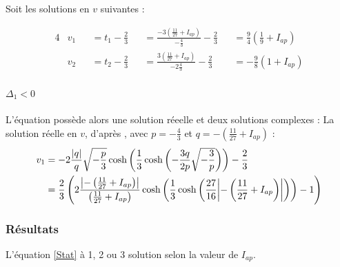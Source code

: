 \documentclass[12pt,a4paper,onecolumn]{article}
\begin{document}
Soit les solutions en $v$ suivantes :

\begin{alignat}{4}
&v_1 &&= t_1 - \frac{2}{3} &&= \displaystyle{\frac{-3(\frac{11}{27} + I_{ap})}{-\frac{4}{3}} - \frac{2}{3}} &&= \frac{9}{4}\left(\frac{1}{9} + I_{ap}\right) \\
&v_2 &&= t_2 - \frac{2}{3} &&= \displaystyle{\frac{3(\frac{11}{27} + I_{ap})}{-2\frac{4}{3}} - \frac{2}{3}} &&= -\frac{9}{8}\left(1 + I_{ap}\right)
\end{alignat}

\paragraph{$\Delta_1 < 0$} L'équation possède alors une solution réeelle et deux solutions complexes :
La solution réelle en $v$, d'après \cite{holmes200286}, avec $p = -\displaystyle{\frac{4}{3}}$ et $q = -\displaystyle{\left(\frac{11}{27} + I_{ap}\right)}$ :
\begin{align}
v_1 &= \displaystyle{-2\frac{\abs{q}}{q}\sqrt{-\frac{p}{3}}\cosh\left(\frac{1}{3}\cosh\left(-\frac{3q}{2p}\sqrt{-\frac{3}{p}}\right)\right)-\frac{2}{3}} \nonumber\\
&= \displaystyle{\frac{2}{3}\left(2\frac{\abs{-\left(\frac{11}{27} + I_{ap}\right)}}{\left(\frac{11}{27} + I_{ap}\right)}\cosh\left(\frac{1}{3}\cosh\left(\frac{27}{16}\abs{-\left(\frac{11}{27} + I_{ap}\right)}\right)\right) - 1\right)} \label{BrancheSolo}
\end{align}

\newpage
\subsubsection{Résultats}
L'équation \ref{Stat} à 1, 2 ou 3 solution selon la valeur de $I_{ap}$.
\end{document}
